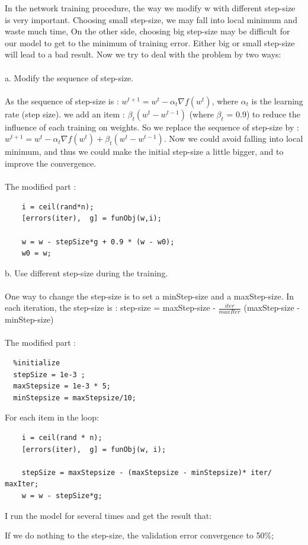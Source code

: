 \documentclass[12pt]{article}
\begin{document}
In the network training procedure, the way we modify w with different step-size is very important. Choosing small step-size, we may fall into local minimum and waste much time, On the other side, choosing big step-size may be difficult for our model to get to the minimum of training error. Either big or small step-size will lead to a bad result. Now we try to deal with the problem by two ways:\\
\\
a. Modify the sequence of step-size.\\
\\
 As the sequence of step-size is : $w^{t+1} = w^t - \alpha_t\nabla f(w^t)$, where $\alpha_t$ is the learning rate (step size).  we add an item : $\beta_t(w^t - w^{t-1})$ (where $\beta_t$ = 0.9) to reduce the influence of each training on weights. So we replace the sequence of step-size by : $w^{t+1} = w^t -\alpha_t\nabla f(w^t) + \beta_t(w^t - w^{t-1})$. Now we could avoid falling into local minimum, and thus we could make the initial step-size a little bigger, and to improve the convergence.\\
\\ 
The modified part :
 \begin{lstlisting}
    i = ceil(rand*n);
    [errors(iter),  g] = funObj(w,i);

    w = w - stepSize*g + 0.9 * (w - w0);
    w0 = w;
 \end{lstlisting}
b. Use different step-size during the training. \\
\\
One way to change the step-size is to set a minStep-size and a maxStep-size. In each iteration, the step-size is : step-size = maxStep-size - $\frac{iter}{maxIter}$ (maxStep-size - minStep-size)\\
\\
The modified part :
\begin{lstlisting}
  %initialize
  stepSize = 1e-3 ;
  maxStepsize = 1e-3 * 5;
  minStepsize = maxStepsize/10;
\end{lstlisting}
For each item in the loop:
\begin{lstlisting}
    i = ceil(rand * n);
    [errors(iter),  g] = funObj(w, i);
    
    stepSize = maxStepsize - (maxStepsize - minStepsize)* iter/ maxIter;
    w = w - stepSize*g;
\end{lstlisting}
I run the model for several times and get the result that: 

If we do nothing to the step-size, the validation error convergence to 50\%;
\end{document}
